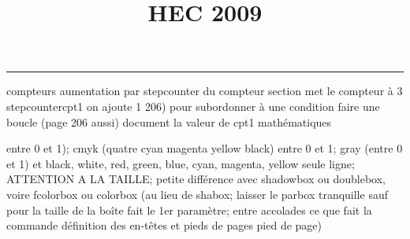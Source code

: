 \documentclass[11pt]{article}%
\title{\bf \vspace{-1cm} HEC 2009} %
\author{} %
\date{} %
\renewcommand{\headrulewidth}{0pt}%
\renewcommand{\footrulewidth}{0.4pt}%
\begin{document}
\maketitle %
\vspace{-1.2cm}\hrule %
\thispagestyle{fancy}

\vspace*{.4cm}


compteurs%
aumentation par stepcounter du compteur section%
met le compteur à 3%
stepcounter{cpt1} on ajoute 1%
206) pour subordonner à une condition %
faire une boucle (page 206 aussi) %
document la valeur de cpt1 
mathématiques\newcommand{\ch}{\operatorname{ch}} 
\newcommand{\sh}{\operatorname{sh}}
\renewcommand{\tanh}{\operatorname{th}}
\renewcommand{\sinh}{\operatorname{sh}}
\renewcommand{\cosh}{\operatorname{ch}}
\newcommand{\argsh}{\operatorname{argsh}}
\newcommand{\argch}{\operatorname{argch}}
\newcommand{\argth}{\operatorname{argth}}
\newcommand{\Id}{\operatorname{Id}}
\renewcommand{\leq}{\leq}
\renewcommand{\geq}{\geq }

\newcommand{\dlim}{\lim}
\newcommand{\dsum}{\sum}
\newcommand{\dprod}{\prod}



entre 0 et 1); cmyk (quatre cyan magenta yellow black) entre 0 et 1;
gray (entre 0 et 1) et black, white, red, green, blue, cyan, magenta,
yellow%
seule ligne; ATTENTION A LA TAILLE; petite différence avec shadowbox ou
doublebox, voire fcolorbox ou colorbox (au lieu de shabox; laisser le
parbox tranquille sauf pour la taille de la boîte
\newcommand{\Tbox}[1]{\begin{center} \shabox{\parbox{0.6
\linewidth}{#1}} \end{center}} %
fait le 1er paramètre; entre accolades ce que fait la commande
définition des en-têtes et pieds de pages\pagestyle{fancy}
\chead{}
\rfoot[ \ \thepage]{\thepage}
\cfoot{}
\lfoot{}
\thispagestyle{fancy} %
pied de page)\renewcommand{\footrulewidth}{0.4pt}
\renewcommand{\headrulewidth}{0.4pt}
\end{document}
